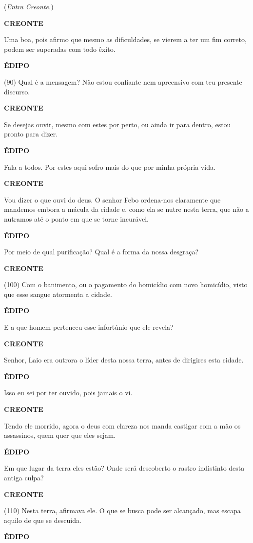 (\emph{Entra Creonte.})

\textbf{CREONTE }

Uma boa, pois afirmo que mesmo as dificuldades, se vierem a ter um fim
correto, podem ser superadas com todo êxito.

\textbf{ÉDIPO}

(90) Qual é a mensagem? Não estou confiante nem apreensivo com teu
presente discurso.

\textbf{CREONTE }

Se desejas ouvir, mesmo com estes por perto, ou ainda ir para dentro,
estou pronto para dizer.

\textbf{ÉDIPO}

Fala a todos. Por estes aqui sofro mais do que por minha própria vida.

\textbf{CREONTE }

Vou dizer o que ouvi do deus. O senhor Febo ordena-nos claramente que
mandemos embora a mácula da cidade e, como ela se nutre nesta terra, que
não a nutramos até o ponto em que se torne incurável.

\textbf{ÉDIPO}

Por meio de qual purificação? Qual é a forma da nossa desgraça?

\textbf{CREONTE }

(100) Com o banimento, ou o pagamento do homicídio com novo homicídio,
visto que esse sangue atormenta a cidade.

\textbf{ÉDIPO}

E a que homem pertenceu esse infortúnio que ele revela?

\textbf{CREONTE }

Senhor, Laio era outrora o líder desta nossa terra, antes de dirigires
esta cidade.

\textbf{ÉDIPO}

Isso eu sei por ter ouvido, pois jamais o vi.

\textbf{CREONTE }

Tendo ele morrido, agora o deus com clareza nos manda castigar com a mão
os assassinos, quem quer que eles sejam.

\textbf{ÉDIPO}

Em que lugar da terra eles estão? Onde será descoberto o rastro
indistinto desta antiga culpa?

\textbf{CREONTE }

(110) Nesta terra, afirmava ele. O que se busca pode ser alcançado, mas
escapa aquilo de que se descuida.

\textbf{ÉDIPO}

